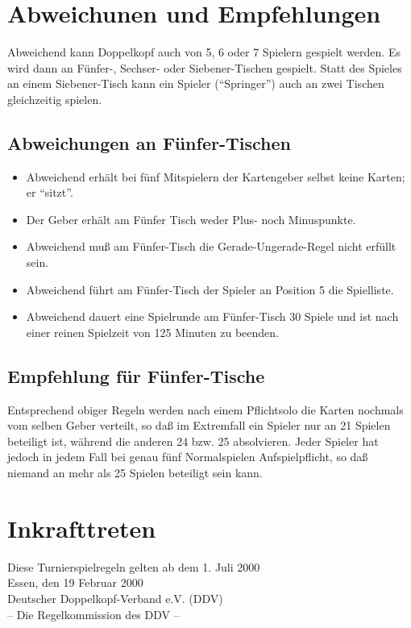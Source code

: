 \documentclass[12pt]{scrartcl}
\begin{document}
\section{Abweichunen und Empfehlungen}
Abweichend kann Doppelkopf auch von 5, 6 oder 7 Spielern gespielt
werden. Es wird dann an Fünfer-, Sechser- oder Siebener-Tischen
gespielt. Statt des Spieles an einem Siebener-Tisch kann ein
Spieler ("`Springer"') auch an zwei Tischen gleichzeitig spielen.

\subsection{Abweichungen an Fünfer-Tischen}
\begin{itemize}
  \item Abweichend erhält bei fünf Mitspielern der Kartengeber selbst keine Karten; er "`sitzt"'.
  \item Der Geber erhält am Fünfer Tisch weder Plus- noch Minuspunkte.
  \item Abweichend muß am Fünfer-Tisch die Gerade-Ungerade-Regel nicht erfüllt sein.
  \item Abweichend führt am Fünfer-Tisch der Spieler an Position 5 die Spielliste.
  \item Abweichend dauert eine Spielrunde am Fünfer-Tisch 30 Spiele und ist nach einer reinen Spielzeit von 125 Minuten zu beenden.
\end{itemize}

\subsection{Empfehlung für Fünfer-Tische}
Entsprechend obiger Regeln werden nach einem Pflichtsolo die Karten nochmals vom selben Geber verteilt, so daß im Extremfall ein Spieler nur an 21 Spielen beteiligt ist, während die anderen 24 bzw. 25 absolvieren. Jeder Spieler hat jedoch in jedem Fall bei genau fünf Normalspielen Aufspielpflicht, so daß niemand an mehr als 25 Spielen beteiligt sein kann.  

\section{Inkrafttreten}
Diese Turnierspielregeln gelten ab dem 1. Juli 2000\\
Essen, den 19 Februar 2000\\
Deutscher Doppelkopf-Verband e.V. (DDV)\\
-- Die Regelkommission des DDV --
\end{document}

